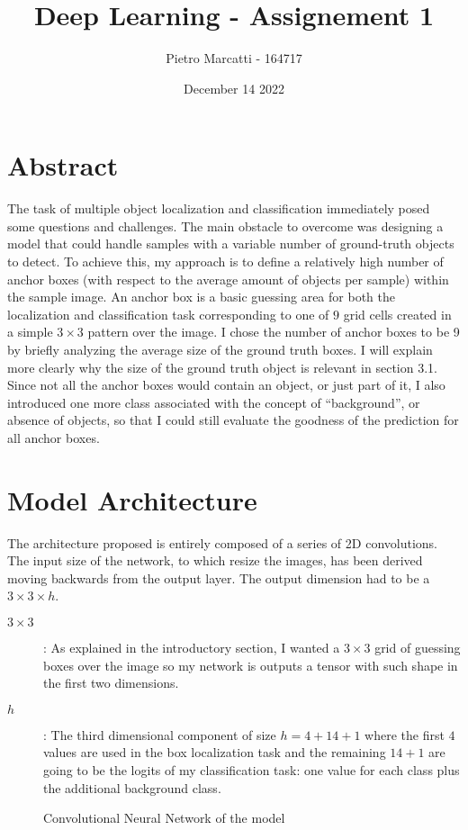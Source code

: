 \documentclass{article}
\title{Deep Learning - Assignement 1}
\author{Pietro Marcatti - 164717}
\date{December 14 2022}
\begin{document}
\maketitle

\section{Abstract}
The task of multiple object localization and classification immediately posed some questions and challenges. The main obstacle to overcome was designing a model that could handle samples with a variable number of ground-truth objects to detect. To achieve this, my approach is to define a relatively high number of anchor boxes (with respect to the average amount of objects per sample) within the sample image. An anchor box is a basic guessing area for both the localization and classification task corresponding to one of $9$ grid cells created in a simple $3 \times 3$ pattern over the image. I chose the number of anchor boxes to be 9 by briefly analyzing the average size of the ground truth boxes. I will explain more clearly why the size of the ground truth object is relevant in section 3.1.  Since not all the anchor boxes would contain an object, or just part of it, I also introduced one more class associated with the concept of “background”, or absence of objects, so that I could still evaluate the goodness of the prediction for all anchor boxes.

\section{Model Architecture}

The architecture proposed is entirely composed of a series of 2D convolutions. The input size of the network, to which resize the images, has been derived moving backwards from the output layer. The output dimension had to be a $3 \times 3 \times h$.
\begin{description}
    \item[$3 \times 3$]: As explained in the introductory section, I wanted a $3 \times 3$ grid of guessing boxes over the image so my network is outputs a tensor with such shape in the first two dimensions.
    \item[$h$]: The third dimensional component of size $h = 4 + 14 +1$ where the first $4$ values are used in the box localization task and the remaining $14 + 1$ are going to be the logits of my classification task: one value for each class plus the additional background class.
\end{description}
\begin{figure}
    
    \caption{Convolutional Neural Network of the model}
\end{figure}
\end{document}

